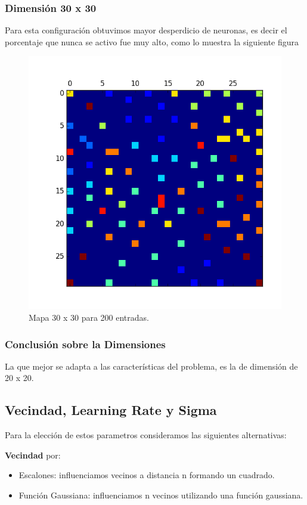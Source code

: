 \subsubsection{Dimensión 30 x 30 }

Para esta configuración obtuvimos mayor desperdicio de neuronas,
es decir el porcentaje que nunca se activo fue muy alto, como lo muestra
la siguiente figura

\begin{figure}[H]
  \centering
  \includegraphics[width=0.8\columnwidth]{../graficos/mapa3030.png}
  \caption{Mapa 30 x 30 para 200 entradas.}
  \label{fig:mapa 30 30 200}
\end{figure}


\subsubsection{Conclusión sobre la Dimensiones}


La que mejor se adapta a las características del problema, es la
de dimensión de 20 x 20.


\subsection{Vecindad, Learning Rate y Sigma}

Para la elección de estos parametros consideramos las siguientes
alternativas:

\textbf{Vecindad} por:

\begin{itemize}
	\item Escalones: influenciamos vecinos a distancia n formando
un cuadrado.
	\item Función Gaussiana: influenciamos n vecinos utilizando
una función gaussiana.
\end{itemize}


